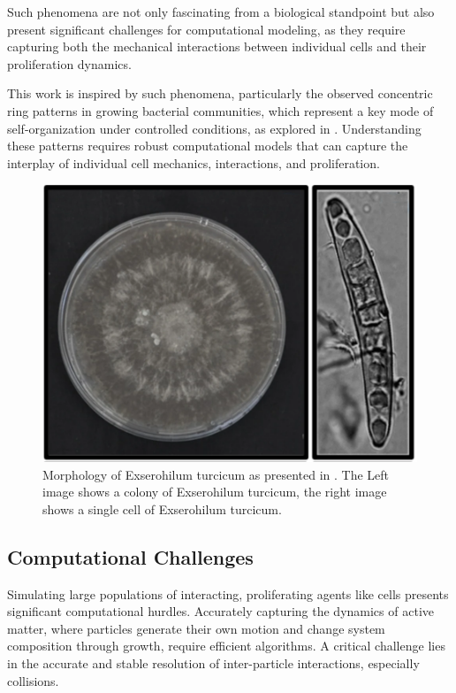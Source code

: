 \documentclass[conference]{IEEEtran}
\begin{document}
Such phenomena are not only fascinating from a biological standpoint but also present significant challenges for computational modeling, as they require capturing both the mechanical interactions between individual cells and their proliferation dynamics.


This work is inspired by such phenomena, particularly the observed concentric ring patterns in growing bacterial communities, which represent a key mode of self-organization under controlled conditions, as explored in \cite{Weady2024}. Understanding these patterns requires robust computational models that can capture the interplay of individual cell mechanics, interactions, and proliferation.

\begin{figure}
    \centering
    \includegraphics[width=\linewidth]{figures/real-bacteria/Exserohilum turcicum.png}
    \caption{Morphology of Exserohilum turcicum as presented in \cite{Bankole2023}. The Left image shows a colony of Exserohilum turcicum, the right image shows a single cell of Exserohilum turcicum.}
    \label{fig:exserohilum_turcicum}
\end{figure}

\subsection{Computational Challenges}

Simulating large populations of interacting, proliferating agents like cells presents significant computational hurdles. Accurately capturing the dynamics of active matter, where particles generate their own motion and change system composition through growth, require efficient algorithms. A critical challenge lies in the accurate and stable resolution of inter-particle interactions, especially collisions.
\end{document}
